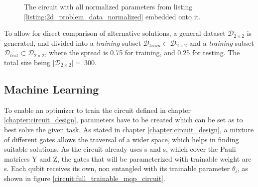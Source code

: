 \begin{figure}[!h]
    \centering
    \caption{The circuit with all normalized parameters from listing \ref{listing:2d_problem_data_normalized} embedded onto it.}
    \label{circuit:example_mqo_solver_circuit_for_2d_problem_data}
\end{figure}

To allow for direct comparison of alternative solutions, a general dataset $\mathcal{D}_{2\times2}$ is generated, and divided into a \emph{training} subset $\mathcal{D}_{train} \subset \mathcal{D}_{2\times2}$ and a \emph{training} subset $\mathcal{D}_{test} \subset \mathcal{D}_{2\times2}$, where the spread is 0.75 for training, and 0.25 for testing. The total size being $\left|\mathcal{D}_{2\times2}\right| =\ 300$.


\subsection{Machine Learning}
\label{chapter:mqo_machine_learning}

To enable an optimizer to train the circuit defined in chapter \ref{chapter:circuit_design}, parameters have to be created which can be set as to best solve the given task. As stated in chapter \ref{chapter:circuit_design}, a mixture of different gates allows the traversal of a wider space, which helps in finding suitable solutions. As the circuit already uses \rygate s and \crzgate s, which cover the Pauli matrices $\mathrm{Y}$ and $\mathrm{Z}$, the gates that will be parameterized with trainable weight are \rxgate s. Each qubit receives its own, non entangled \rxgate with its trainable parameter $\theta_i$, as shown in figure \ref{circuit:full_trainable_mqp_circuit}.

